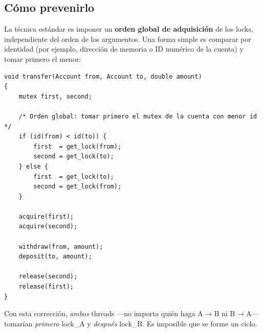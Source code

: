 \documentclass[11pt,a4paper]{article}
\begin{document}
\begin{center}
\end{center}

\subsection*{Cómo prevenirlo}

La técnica estándar es imponer un \textbf{orden global de
adquisición} de los locks, independiente del orden de los argumentos.
Una forma simple es comparar por identidad (por ejemplo, dirección
de memoria o ID numérico de la cuenta) y tomar primero el menor:

\begin{lstlisting}[style=cstyle]
void transfer(Account from, Account to, double amount)
{
    mutex first, second;

    /* Orden global: tomar primero el mutex de la cuenta con menor id */
    if (id(from) < id(to)) {
        first  = get_lock(from);
        second = get_lock(to);
    } else {
        first  = get_lock(to);
        second = get_lock(from);
    }

    acquire(first);
    acquire(second);

    withdraw(from, amount);
    deposit(to, amount);

    release(second);
    release(first);
}
\end{lstlisting}

Con esta corrección, \emph{ambos} threads ---no importa quién haga
A$\to$B ni B$\to$A--- tomarían \emph{primero} lock\_A y \emph{después}
lock\_B. Es imposible que se forme un ciclo.
\end{document}

